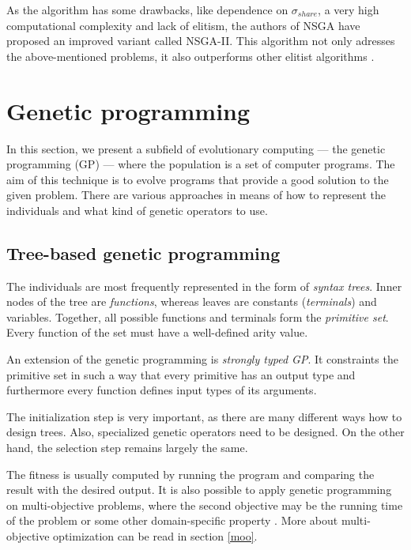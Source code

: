 \label{nsgaii}
As the algorithm has some drawbacks, like dependence on $\sigma_{share}$,
a very high computational complexity and lack of elitism, the authors of
NSGA have proposed an improved variant called NSGA-II. This algorithm not only
adresses the above-mentioned problems, it also outperforms other elitist
algorithms \citep{Deb:2002:FEM:2221359.2221582}.

\section{Genetic programming}
In this section, we present a subfield of evolutionary computing --- 
the genetic programming (GP) --- where the population is a set of computer 
programs. The aim of this technique is to evolve programs that provide 
a good solution to the given problem. There are various approaches in means 
of how to represent the individuals and what kind of genetic operators to 
use.

\subsection{Tree-based genetic programming} \label{gp:treebased}
The individuals are most frequently represented in the form of 
\emph{syntax trees}. Inner nodes of the tree are \emph{functions}, whereas 
leaves  are constants (\emph{terminals}) and variables. Together, all possible
functions and terminals form the \emph{primitive set}. Every function of the
set must have a well-defined arity value.

An extension of the genetic programming is \emph{strongly typed GP}. It
constraints the primitive set in such a way that every primitive has an output
type and furthermore every function defines input types of its arguments.

The initialization step is very important, as
there are many different ways how to design trees. Also, specialized genetic
operators need to be designed. On the other hand, the selection step remains
largely the same. \cite{Poli:2008:FGG:1796422}
 
The fitness is usually computed by running the program and comparing the result 
with the desired output. It is also possible to apply genetic programming on
multi-objective problems, where the second objective may be the running time
of the problem or some other domain-specific property
\citep{Poli:2008:FGG:1796422}. More about multi-objective optimization can be
read in section \ref{moo}.

